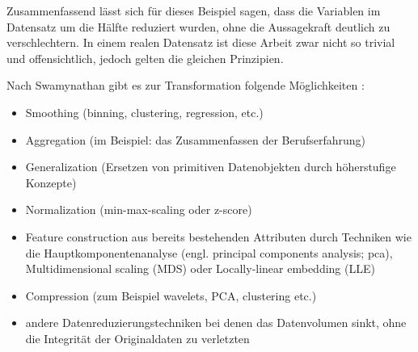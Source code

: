 Zusammenfassend lässt sich für dieses Beispiel sagen, dass die Variablen im Datensatz um die Hälfte reduziert wurden, ohne die Aussagekraft deutlich zu verschlechtern. In einem realen Datensatz ist diese Arbeit zwar nicht so trivial und offensichtlich, jedoch gelten die gleichen Prinzipien.\par
Nach Swamynathan gibt es zur Transformation folgende Möglichkeiten \citep[S.~71; veränderte Version]{swamynathan_mastering_2017}:
\begin{itemize}
\item Smoothing (binning, clustering, regression, etc.)
\item Aggregation (im Beispiel: das Zusammenfassen der Berufserfahrung)
\item Generalization (Ersetzen von primitiven Datenobjekten durch höherstufige Konzepte)
\item Normalization (min-max-scaling oder z-score)
\item Feature construction aus bereits bestehenden Attributen durch Techniken wie die Hauptkomponentenanalyse (engl. principal components analysis; \gls{pca}), Multidimensional scaling (MDS) oder Locally-linear embedding (LLE)
\item Compression (zum Beispiel wavelets, PCA, clustering etc.)
\item andere Datenreduzierungstechniken bei denen das Datenvolumen sinkt, ohne die Integrität der Originaldaten zu verletzten
\end{itemize}


